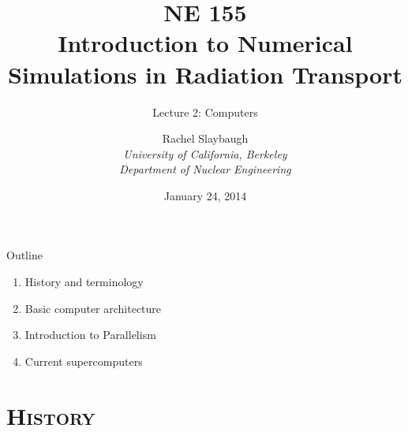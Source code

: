 \documentclass[xcolor=x11names,compress]{beamer}
\renewcommand{\(}{\begin{columns}}
\renewcommand{\)}{\end{columns}}
\newcommand{\<}[1]{\begin{column}{#1}}
\renewcommand{\>}{\end{column}}
\begin{document}
\begin{frame}
\title{NE 155\\Introduction to Numerical Simulations in Radiation Transport}
\subtitle{Lecture 2: Computers}
\author{
        Rachel Slaybaugh\\
        \vspace*{1em}
        {\it University of California, Berkeley\\
         Department of Nuclear Engineering}\\
}
\date{January 24, 2014}
\titlepage
\end{frame}


\begin{frame}{Outline}
\begin{enumerate}
\item History and terminology
\item Basic computer architecture
\item Introduction to Parallelism
\item Current supercomputers
\end{enumerate}
\end{frame}

\section{\scshape History}
\end{document}
